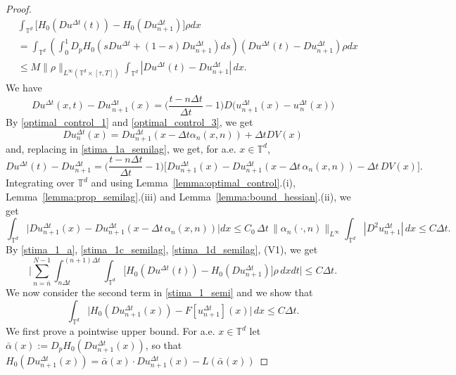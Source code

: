 \documentclass[11pt]{amsart}
\theoremstyle{remark}
\theoremstyle{definition}
\theoremstyle{Claim}
\newcommand{\T}{{\mathbb{T}}}
\theoremstyle{plain}
\newcommand{\dt}{{\Delta t}}
\begin{document}
\begin{proof}
	\begin{equation}\label{stima_1_a}
		\begin{split}
			&	\int_{\T^d}\Big[H_{0}(D u^\dt(t))-H_{0}(Du^\dt_{n+1})\Big]\rho dx\\
			&	=\int_{\T^d}\left(\int_0^1 D_pH_{0}(sD u^\dt+(1-s)D u^\dt_{n+1})ds\right)(D u^\dt(t)- D u^\dt_{n+1})\rho dx\\
			&\le M\|\rho\|_{L^\infty(\T^d\times[\tau,T])}\int_{\T^d}|D u^\dt(t)-D u^\dt_{n+1}|\,dx.
		\end{split}
	\end{equation}
We have
\begin{equation}\label{stima_1a_semilag}
Du^\dt(x,t)- Du^\dt_{\,n+1}(x)
= \bigg(\frac{t-n\dt}{\dt}-1\bigg)D\big(u^\dt_{n+1}(x)-u^\dt_{\,n}(x)\big)
\end{equation}	
By	  \eqref{optimal_control_1} and	  \eqref{optimal_control_3}, we get
\[
D  u^\dt_n(x)=Du^\dt_{n+1}(x-\dt\alpha_{n}(x,n))+ \dt DV(x)
\]
and, replacing in \eqref{stima_1a_semilag}, we get, for a.e. $x\in\T^d$,
\begin{equation}\label{stima_1c_semilag}
	D u^\dt(t)- D u^\dt_{n+1}
	= \bigg(\frac{t-n\dt}{\dt}-1\bigg)
	\Big[Du^\dt_{n+1}(x)- Du^\dt_{n+1}(x-\dt\,\alpha_{n}(x,n))-\dt\, DV(x)\Big].
\end{equation}
Integrating over $\T^d$ and using Lemma~\ref{lemma:optimal_control}.(i), Lemma~\ref{lemma:prop_semilag}.(iii) and
Lemma~\ref{lemma:bound_hessian}.(ii), we get
\begin{equation}\label{stima_1d_semilag}
	\int_{\T^d}\bigl|D u^\dt_{n+1}(x)-D u^\dt_{n+1}(x-\dt\,\alpha_n(x,n))\bigr|dx
	\le C_0\,\dt\,\|\alpha_n(\cdot,n)\|_{L^\infty}
	\int_{\T^d}|D^2u^\dt_{n+1}|\,dx\le C\dt .
\end{equation}
By \eqref{stima_1_a}, \eqref{stima_1c_semilag}, \eqref{stima_1d_semilag},
\textup{(V1)}, we get
\begin{equation}\label{stima_1_semilag}
	\Big|\sum_{n=\bar n}^{N-1}\int_{n\dt}^{(n+1)\dt}\int_{\T^d}
	\Big[H_{0}(D u^\dt(t))-H_{0}(Du^\dt_{n+1})\Big]\rho\, dxdt\Big|\le C\dt .
\end{equation}
We now consider the second term in \eqref{stima_1_semi} and we show that
\begin{equation}\label{stima_G}
	\int_{\T^d}\bigl|H_0(Du^\dt_{n+1}(x))-F[u^\dt_{n+1}](x)\bigr|\,dx\le C\dt .
\end{equation}
We first prove a pointwise upper bound. For a.e. $x\in\T^d$ let
$\bar\alpha(x):=D_pH_0(Du^\dt_{n+1}(x))$, so that
$H_{0}(Du^\dt_{n+1}(x))={\bar\alpha(x)}\cdot Du^\dt_{n+1}(x)-L({\bar\alpha(x)})$

\end{proof}
\end{document}
